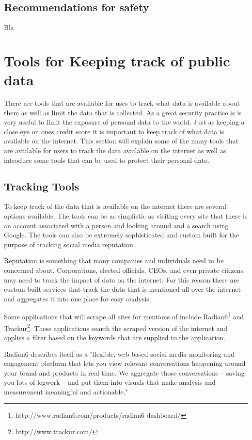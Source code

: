 \documentclass[man]{apa}%
\begin{document}
\subsection{Recommendations for safety}
Bla

\newpage
\section{Tools for Keeping track of public data}
There are tools that are available for uses to track what data is available about
them as well as limit the data that is collected. As a great security practice
is is very useful to limit the exposure of personal data to the world. Just as
keeping a close eye on ones credit score it is important to keep track of what
data is available on the internet. This section will explain some of the many
tools that are available for users to track the data available on the internet
as well as introduce some tools that can be used to protect their personal data.

\subsection{Tracking Tools}
To keep track of the data that is available on the internet there are several
options available. The tools can be as simplistic as visiting every site that
there is an account associated with a person and looking around and a search
using Google. The tools can also be extremely sophisticated and custom built for
the purpose of tracking social media reputation. 

Reputation is something that many companies and individuals need to be concerned
about. Corporations, elected officials, CEOs, and even private citizens may need
to track the impact of data on the internet. For this reason there are custom
built services that track the data that is mentioned all over the internet and
aggregates it into one place for easy analysis. 

Some applications that will scrape all sites for mentions of include
Radian6\footnote{http://www.radian6.com/products/radian6-dashboard/} and 
Trackur\footnote{http://www.trackur.com/}. These applications search the
scraped version of the internet and applies a filter based on the keywords that
are supplied to the application. 

Radian6 describes itself as a "flexible, web-based social media monitoring and 
engagement platform that lets you view relevant conversations happening around 
your brand and products in real time. We aggregate those conversations – saving 
you lots of legwork – and put them into visuals that make analysis and 
measurement meaningful and actionable."~\cite{Radian6}
\end{document}
